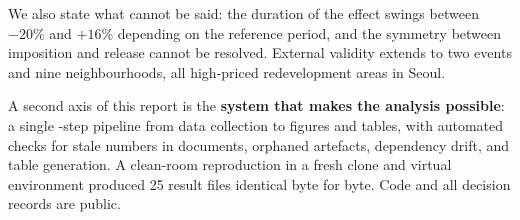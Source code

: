 We also state what cannot be said: the duration of the effect swings between
$-20\%$ and $+16\%$ depending on the reference period, and the symmetry between
imposition and release cannot be resolved. External validity extends to two
events and nine neighbourhoods, all high-priced redevelopment areas in Seoul.

A second axis of this report is the \textbf{system that makes the analysis
possible}: a single \pipeSteps-step pipeline from data collection to figures and
tables, with automated checks for stale numbers in documents, orphaned
artefacts, dependency drift, and table generation. A clean-room reproduction in a fresh clone and
virtual environment produced 25 result files identical byte for byte. Code and
all \pipeDecisions{} decision records are public.
\normalsize

